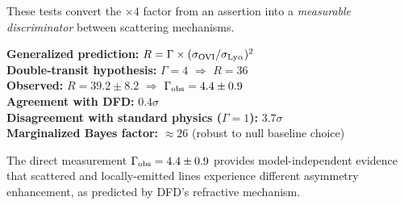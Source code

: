 These tests convert the $\times 4$ factor from an assertion into a \emph{measurable 
discriminator} between scattering mechanisms.

\begin{tcolorbox}[colback=green!5!white, colframe=green!60!black, title=UVCS Multi-Wavelength Test: PASSED]
\textbf{Generalized prediction:} $R = \Gamma \times (\sigma_{\rm OVI}/\sigma_{\rm Ly\alpha})^2$\\
\textbf{Double-transit hypothesis:} $\Gamma = 4$ $\Rightarrow$ $R = 36$\\
\textbf{Observed:} $R = 39.2 \pm 8.2$ $\Rightarrow$ $\Gamma_{\rm obs} = 4.4 \pm 0.9$\\
\textbf{Agreement with DFD:} $0.4\sigma$\\
\textbf{Disagreement with standard physics ($\Gamma=1$):} $3.7\sigma$\\
\textbf{Marginalized Bayes factor:} $\approx 26$ (robust to null baseline choice)
\end{tcolorbox}

The direct measurement $\Gamma_{\rm obs} = 4.4 \pm 0.9$ provides model-independent 
evidence that scattered and locally-emitted lines experience different asymmetry 
enhancement, as predicted by DFD's refractive mechanism.
